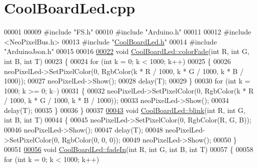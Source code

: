 \hypertarget{_cool_board_led_8cpp_source}{}\section{Cool\+Board\+Led.\+cpp}

\begin{DoxyCode}
00001 
00009 \textcolor{preprocessor}{#include "FS.h"}
00010 \textcolor{preprocessor}{#include "Arduino.h"}
00011 
00012 \textcolor{preprocessor}{#include <NeoPixelBus.h>}
00013 \textcolor{preprocessor}{#include "\hyperlink{_cool_board_led_8h}{CoolBoardLed.h}"}
00014 \textcolor{preprocessor}{#include "ArduinoJson.h"}
00015 
00016 
\hyperlink{class_cool_board_led_a6dbfe23988f43e1242cd05e69b13ff30}{00022} \textcolor{keywordtype}{void} \hyperlink{class_cool_board_led_a6dbfe23988f43e1242cd05e69b13ff30}{CoolBoardLed::colorFade}(\textcolor{keywordtype}{int} R, \textcolor{keywordtype}{int} G, \textcolor{keywordtype}{int} B, \textcolor{keywordtype}{int} T) 
00023 \{
00024     \textcolor{keywordflow}{for} (\textcolor{keywordtype}{int} k = 0; k < 1000; k++) 
00025     \{
00026         neoPixelLed->SetPixelColor(0, RgbColor(k * R / 1000, k * G / 1000, k * B / 1000));
00027         neoPixelLed->Show();
00028         delay(T);
00029     \}
00030     \textcolor{keywordflow}{for} (\textcolor{keywordtype}{int} k = 1000; k >= 0; k--) 
00031     \{
00032         neoPixelLed->SetPixelColor(0, RgbColor(k * R / 1000, k * G / 1000, k * B / 1000));
00033         neoPixelLed->Show();
00034         delay(T);
00035     \}
00036 \}
00037 
\hyperlink{class_cool_board_led_a27706bc029f6a126c55d0b91624ad7fa}{00043} \textcolor{keywordtype}{void} \hyperlink{class_cool_board_led_a27706bc029f6a126c55d0b91624ad7fa}{CoolBoardLed::blink}(\textcolor{keywordtype}{int} R, \textcolor{keywordtype}{int} G, \textcolor{keywordtype}{int} B, \textcolor{keywordtype}{int} T) 
00044 \{
00045     neoPixelLed->SetPixelColor(0, RgbColor(R, G, B));
00046     neoPixelLed->Show();
00047     delay(T);
00048     neoPixelLed->SetPixelColor(0, RgbColor(0, 0, 0));
00049     neoPixelLed->Show();
00050 \}
00051 
\hyperlink{class_cool_board_led_aec915442a8441c7cd45c3279d3ff8821}{00056} \textcolor{keywordtype}{void} \hyperlink{class_cool_board_led_aec915442a8441c7cd45c3279d3ff8821}{CoolBoardLed::fadeIn}(\textcolor{keywordtype}{int} R, \textcolor{keywordtype}{int} G, \textcolor{keywordtype}{int} B, \textcolor{keywordtype}{int} T) 
00057 \{
00058     \textcolor{keywordflow}{for} (\textcolor{keywordtype}{int} k = 0; k < 1000; k++) 

\end{DoxyCode}
